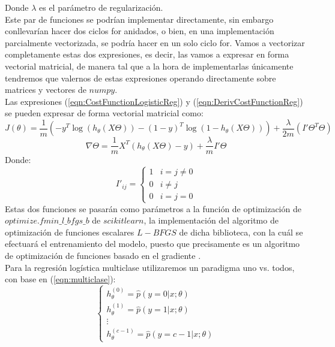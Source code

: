 \documentclass[runningheads]{llncs}
\begin{document}
Donde $\lambda$ es el parámetro de regularización.\cite{MLCoursera}\\
Este par de funciones se podrían implementar directamente, sin embargo conllevarían hacer dos ciclos for anidados, o bien, en una implementación parcialmente vectorizada, se podría hacer en un solo ciclo for. Vamos a vectorizar completamente estas dos expresiones, es decir, las vamos a expresar en forma vectorial matricial, de manera tal que a la hora de implementarlas únicamente tendremos que valernos de estas expresiones operando directamente sobre matrices y vectores de $numpy$.\\
Las expresiones (\ref{eqn:CostFunctionLogisticReg}) y (\ref{eqn:DerivCostFunctionReg}) se pueden expresar de forma vectorial matricial como:
\begin{equation}
        J(\theta) = \frac{1}{m}(-y^T\log(h_{\theta}(X\Theta)) - (1 - y)^T\log(1 - h_{\theta}(X\Theta))) + \frac{\lambda}{2m}(I'\Theta^T\Theta)
    \label{eqn:CostFunctionLogisticReg}
\end{equation}
\begin{equation}
        \nabla\Theta = \frac{1}{m}X^T(h_{\theta}(X\Theta) - y) + \frac{\lambda}{m}I'\Theta
    \label{eqn:DerivCostFunctionReg}
\end{equation}
Donde:
\begin{equation}
    I'_{ij} = \begin{cases}
        1 & i = j \neq 0 \\
        0 & i \neq j \\
        0 & i = j = 0
    \end{cases}
\end{equation}
Estas dos funciones se pasarán como parámetros a la función de optimización de $optimize.fmin\_l\_bfgs\_b$ de $scikitlearn$, la implementación del algoritmo de optimización de funciones escalares $L-BFGS$ de dicha biblioteca, con la cuál se efectuará el entrenamiento del modelo, puesto que precisamente es un algoritmo de optimización de funciones basado en el gradiente \cite{NoceWrig06}.\\
\noindent
Para la regresión logística multiclase utilizaremos un paradigma uno vs. todos, con base en (\ref{eqn:multiclase}):
\begin{equation}
    \begin{cases}
        h_{\theta}^{(0)} = \hat{p}(y = 0|x;\theta)\\
        h_{\theta}^{(1)} = \hat{p}(y = 1|x;\theta)\\
        \vdots\\
        h_{\theta}^{(c - 1)} = \hat{p}(y = c - 1|x;\theta)
    \end{cases}
\end{equation}
\end{document}
